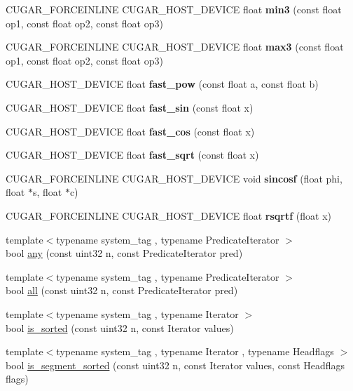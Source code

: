 \begin{DoxyCompactItemize}
\item 
C\+U\+G\+A\+R\+\_\+\+F\+O\+R\+C\+E\+I\+N\+L\+I\+NE C\+U\+G\+A\+R\+\_\+\+H\+O\+S\+T\+\_\+\+D\+E\+V\+I\+CE float {\bfseries min3} (const float op1, const float op2, const float op3)
\item 
C\+U\+G\+A\+R\+\_\+\+F\+O\+R\+C\+E\+I\+N\+L\+I\+NE C\+U\+G\+A\+R\+\_\+\+H\+O\+S\+T\+\_\+\+D\+E\+V\+I\+CE float {\bfseries max3} (const float op1, const float op2, const float op3)
\item 
C\+U\+G\+A\+R\+\_\+\+H\+O\+S\+T\+\_\+\+D\+E\+V\+I\+CE float {\bfseries fast\+\_\+pow} (const float a, const float b)
\item 
C\+U\+G\+A\+R\+\_\+\+H\+O\+S\+T\+\_\+\+D\+E\+V\+I\+CE float {\bfseries fast\+\_\+sin} (const float x)
\item 
C\+U\+G\+A\+R\+\_\+\+H\+O\+S\+T\+\_\+\+D\+E\+V\+I\+CE float {\bfseries fast\+\_\+cos} (const float x)
\item 
C\+U\+G\+A\+R\+\_\+\+H\+O\+S\+T\+\_\+\+D\+E\+V\+I\+CE float {\bfseries fast\+\_\+sqrt} (const float x)
\item 
C\+U\+G\+A\+R\+\_\+\+F\+O\+R\+C\+E\+I\+N\+L\+I\+NE C\+U\+G\+A\+R\+\_\+\+H\+O\+S\+T\+\_\+\+D\+E\+V\+I\+CE void {\bfseries sincosf} (float phi, float $\ast$s, float $\ast$c)
\item 
C\+U\+G\+A\+R\+\_\+\+F\+O\+R\+C\+E\+I\+N\+L\+I\+NE C\+U\+G\+A\+R\+\_\+\+H\+O\+S\+T\+\_\+\+D\+E\+V\+I\+CE float {\bfseries rsqrtf} (float x)
\item 
{\footnotesize template$<$typename system\+\_\+tag , typename Predicate\+Iterator $>$ }\\bool \hyperlink{group___primitives_ga71416af3e5407b31c78a10026520dbed}{any} (const uint32 n, const Predicate\+Iterator pred)
\item 
{\footnotesize template$<$typename system\+\_\+tag , typename Predicate\+Iterator $>$ }\\bool \hyperlink{group___primitives_gaa98aa06ec6a5f38dda15d74ce0c47d57}{all} (const uint32 n, const Predicate\+Iterator pred)
\item 
{\footnotesize template$<$typename system\+\_\+tag , typename Iterator $>$ }\\bool \hyperlink{group___primitives_gaec6f4aab196d418865686901c11a093c}{is\+\_\+sorted} (const uint32 n, const Iterator values)
\item 
{\footnotesize template$<$typename system\+\_\+tag , typename Iterator , typename Headflags $>$ }\\bool \hyperlink{group___primitives_ga5e6eb75d00ed617295bcee0b1db0ee3e}{is\+\_\+segment\+\_\+sorted} (const uint32 n, const Iterator values, const Headflags flags)

\end{DoxyCompactItemize}
